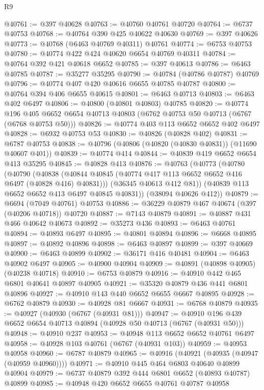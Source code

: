 \begin{lexlean}{R9}
\begin{coremodule}
@40761 := @397 @40628
@40763 := @40760 @40761 @40720
@40764 := @6737 @40753
@40768 := @40764 @390 @425 @40622 @40630
@40769 := @397 @40626
@40773 := @40768 (@6463 @40769 @40311) @40761
@40774 := @6753 @40753
@40780 := @40774 @422 @424 @40620 @6654 @40769 @40311
@40784 := @40764 @392 @421 @40618 @6652
@40785 := @397 @40613
@40786 := @6463 @40785
@40787 := @35277 @35295
@40790 := @40784 (@40786 @40787) @40769
@40796 := @40774 @407 @420 @40616 @6655 @40785 @40787
@40800 := @40764 @394 @406 @6655 @40615
@40801 := @6463 @40713
@40803 := @6463 @402 @6497
@40806 := @40800 (@40801 @40803) @40785
@40820 := @40774
    @196
    @405
    @6652
    @6654
    @40713
    @40803
    (@6762 @40753 @50 @40713 (@6767 (@6768 @40753 @50)))
@40826 := @40774 @403 @113 @6652 @6652 @402 @6497
@40828 := @6932 @40753 @53
@40830 := @40826 (@40828 @402)
@40831 := @6787 @40753
@40838 := @40796 (@40806 (@40820 (@40830 @40831)) (@11690 @40607 @401))
@40839 := @40774 @414
@40844 := @40839 @419 @6652 @6654 @413 @35295
@40845 := @40828 @413
@40876 := @40763
    (@40773
      (@40780
        (@40790
          (@40838 (@40844 @40845 (@40774 @417 @113 @6652 @6652 @416 @6497 (@40828 @416) @40831)))
          (@36345 @40613 @412 @81))
        (@40839 @113 @6652 @6652 @413 @6497 @40845 @40831))
      (@38094 @40626 @412))
@40879 := @6694 (@7049 @40761) @40753
@40886 := @36229 @40879 @467 @40674 (@397 (@40206 @40718)) @40720
@40887 := @7143 @40879
@40891 := @40887 @431 @466 @40642 @40673
@40892 := @35273 @436
@40893 := @6463 @40761
@40894 := @40893 @6497
@40895 := @40801 @40894
@40896 := @6668 @40895
@40897 := @40892 @40896
@40898 := @6463 @40897
@40899 := @397 @40669
@40900 := @6463 @40899
@40902 := @36171 @416 @40481
@40904 := @6463 @40902 @6497
@40905 := @40900 @40904
@40909 := @40891 (@40898 @40905) (@40238 @40718)
@40910 := @6753 @40879
@40916 := @40910 @442 @465 @6801 @40641 @40897 @40905
@40921 := @35320 @40879 @436 @441 @6801 @40896
@40927 := @40910 @143 @440 @6652 @6655 @6667 @40895
@40928 := @6762 @40879
@40930 := @40928 @81 @6667
@40931 := @6768 @40879
@40935 := @40927 (@40930 (@6767 (@40931 @81)))
@40947 := @40910 @196 @439 @6652 @6654 @40713 @40894 (@40928 @50 @40713 (@6767 (@40931 @50)))
@40948 := @40910 @237
@40953 := @40948 @113 @6652 @6652 @40761 @6497
@40958 := @40928 @103 @40761 (@6767 (@40931 @103))
@40959 := @40953 @40958
@40960 := @6787 @40879
@40965 := @40916 (@40921 (@40935 (@40947 (@40959 @40960))))
@40971 := @40910 @445 @464 @6803 @40640 @40899 @40904
@40979 := @6737 @40879 @392 @444 @6801 @6652 (@40893 @40787) @40899
@40985 := @40948 @420 @6652 @6655 @40761 @40787 @40958

\end{coremodule}
\end{lexlean}
